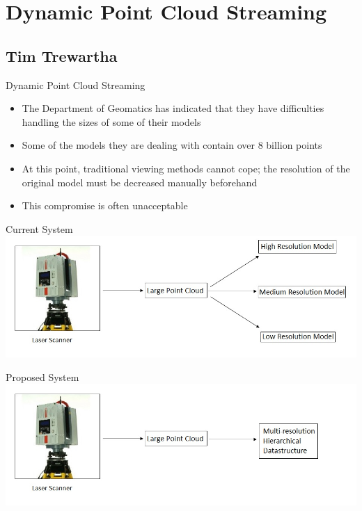 \documentclass{beamer}
\begin{document}
{
 {
    \vfill
    \vskip2pt%
    \vskip2pt%

}

\section{Dynamic Point Cloud Streaming}
\subsection{Tim Trewartha}
\begin{frame}{Dynamic Point Cloud Streaming}
\begin{itemize}
\item The Department of Geomatics has indicated that they have difficulties
  handling the sizes of some of their models
\item Some of the models they are dealing with contain over 8 billion points
\item At this point, traditional viewing methods cannot cope; the resolution
  of the original model must be decreased manually beforehand
\item This compromise is often unacceptable
\end{itemize}
\end{frame}

\begin{frame}{Current System}
\includegraphics[scale=1.4]{images/laser.jpg}
\end{frame}

\begin{frame}{Proposed System}
\includegraphics[scale=1.4]{images/laser2.jpg}
\end{frame}


}
\end{document}
